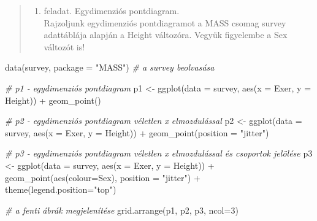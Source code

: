 \documentclass[
]{book}
\newenvironment{Shaded}{\begin{snugshade}}{\end{snugshade}}
\newcommand{\AttributeTok}[1]{\textcolor[rgb]{0.77,0.63,0.00}{#1}}
\newcommand{\CommentTok}[1]{\textcolor[rgb]{0.56,0.35,0.01}{\textit{#1}}}
\newcommand{\DecValTok}[1]{\textcolor[rgb]{0.00,0.00,0.81}{#1}}
\newcommand{\FunctionTok}[1]{\textcolor[rgb]{0.00,0.00,0.00}{#1}}
\newcommand{\NormalTok}[1]{#1}
\newcommand{\OtherTok}[1]{\textcolor[rgb]{0.56,0.35,0.01}{#1}}
\newcommand{\SpecialCharTok}[1]{\textcolor[rgb]{0.00,0.00,0.00}{#1}}
\newcommand{\StringTok}[1]{\textcolor[rgb]{0.31,0.60,0.02}{#1}}
\providecommand{\tightlist}{%
  \setlength{\itemsep}{0pt}\setlength{\parskip}{0pt}}
\begin{document}
\begin{quote}
\begin{enumerate}
\def\labelenumi{\arabic{enumi}.}
\setcounter{enumi}{5}
\tightlist
\item
  feladat. Egydimenziós pontdiagram.\\
  Rajzoljunk egydimenziós pontdiagramot a MASS csomag survey adattáblája alapján a Height változóra. Vegyük figyelembe a Sex változót is!
\end{enumerate}
\end{quote}

\begin{Shaded}
\begin{Highlighting}[]
\FunctionTok{data}\NormalTok{(survey, }\AttributeTok{package =} \StringTok{"MASS"}\NormalTok{) }\CommentTok{\# a survey beolvasása}

\CommentTok{\# p1 {-} egydimenziós pontdiagram}
\NormalTok{p1 }\OtherTok{\textless{}{-}} \FunctionTok{ggplot}\NormalTok{(}\AttributeTok{data =}\NormalTok{ survey, }\FunctionTok{aes}\NormalTok{(}\AttributeTok{x =}\NormalTok{ Exer, }\AttributeTok{y =}\NormalTok{ Height)) }\SpecialCharTok{+} \FunctionTok{geom\_point}\NormalTok{()}

\CommentTok{\# p2 {-} egydimenziós pontdiagram véletlen x elmozdulással}
\NormalTok{p2 }\OtherTok{\textless{}{-}} \FunctionTok{ggplot}\NormalTok{(}\AttributeTok{data =}\NormalTok{ survey, }\FunctionTok{aes}\NormalTok{(}\AttributeTok{x =}\NormalTok{ Exer, }\AttributeTok{y =}\NormalTok{ Height)) }\SpecialCharTok{+} \FunctionTok{geom\_point}\NormalTok{(}\AttributeTok{position =} \StringTok{"jitter"}\NormalTok{)}

\CommentTok{\# p3 {-} egydimenziós pontdiagram véletlen x elmozdulással és csoportok jelölése}
\NormalTok{p3 }\OtherTok{\textless{}{-}} \FunctionTok{ggplot}\NormalTok{(}\AttributeTok{data =}\NormalTok{ survey, }\FunctionTok{aes}\NormalTok{(}\AttributeTok{x =}\NormalTok{ Exer, }\AttributeTok{y =}\NormalTok{ Height)) }\SpecialCharTok{+} 
        \FunctionTok{geom\_point}\NormalTok{(}\FunctionTok{aes}\NormalTok{(}\AttributeTok{colour=}\NormalTok{Sex), }\AttributeTok{position =} \StringTok{"jitter"}\NormalTok{) }\SpecialCharTok{+} 
        \FunctionTok{theme}\NormalTok{(}\AttributeTok{legend.position=}\StringTok{"top"}\NormalTok{)}

\CommentTok{\# a fenti ábrák megjelenítése}
\FunctionTok{grid.arrange}\NormalTok{(p1, p2, p3, }\AttributeTok{ncol=}\DecValTok{3}\NormalTok{)}
\end{Highlighting}
\end{Shaded}
\end{document}
